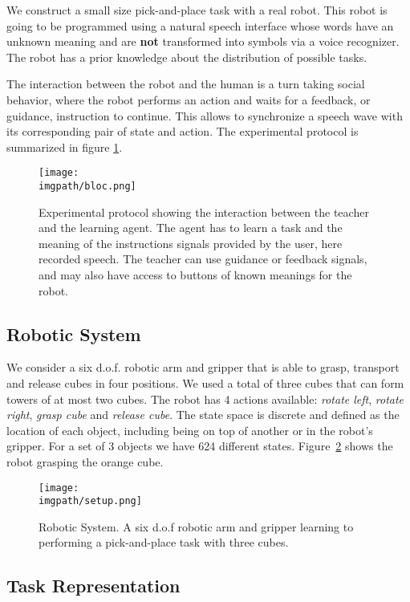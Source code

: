 We construct a small size pick-and-place task with a real robot. This robot is going to be programmed using a natural speech interface whose words have an unknown meaning and are \textbf{not} transformed into symbols via a voice recognizer. The robot has a prior knowledge about the distribution of possible tasks.

The interaction between the robot and the human is a turn taking social behavior, where the robot performs an action and waits for a feedback, or guidance, instruction to continue. This allows to synchronize a speech wave with its corresponding pair of state and action. The experimental protocol is summarized in figure \ref{fig:lfui:bloc}.

\begin{figure}[!ht]
  \centering
  \texttt{[image: \\imgpath/bloc.png]}
  \caption{Experimental protocol showing the interaction between the teacher and the learning agent. The agent has to learn a task and the meaning of the instructions signals provided by the user, here recorded speech. The teacher can use guidance or feedback signals, and may also have access to buttons of known meanings for the robot.}
  \label{fig:lfui:bloc}    
\end{figure}

\subsection{Robotic System}

We consider a six d.o.f. robotic arm and gripper that is able to grasp, transport and release cubes in four positions. We used a total of three cubes that can form towers of at most two cubes.  The robot has 4 actions available: \textit{rotate left}, \textit{rotate right}, \textit{grasp cube} and \textit{release cube}. The state space is discrete and defined as the location of each object, including being on top of another or in the robot's gripper. For a set of 3 objects we have 624 different states. Figure~\ref{fig:lfui:setup} shows the robot grasping the orange cube. 

\begin{figure}[!ht]
  \centering
  \texttt{[image: \\imgpath/setup.png]}
  \caption{Robotic System. A six d.o.f robotic arm and gripper learning to performing a pick-and-place task with three cubes.}
  \label{fig:lfui:setup}
\end{figure}

\subsection{Task Representation}

